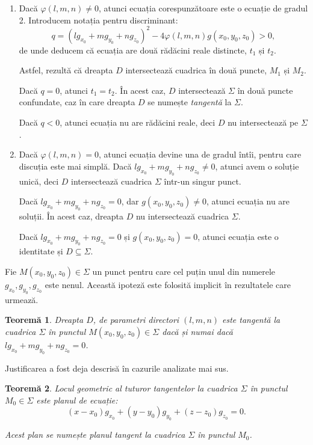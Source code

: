\documentclass[11pt,a4paper]{article}
\newcommand\seq{\subseteq}
\theoremstyle{dotless}
\newtheorem{theorem}{Teorem\u{a}}[section]
\theoremstyle{dotlessdr}
\begin{document}
\begin{enumerate}[(1)]
	\item Dacă $\varphi(l, m, n) \neq 0$, atunci ecuația corespunzătoare
este o ecuație de gradul 2. Introducem notația pentru discriminant: 
 \[
	q = (lg_{x_0} + mg_{y_0} + ng_{z_0})^2 - 
	    4\varphi(l, m, n)g(x_0, y_0, z_0) > 0,
\]
de unde deducem că ecuația are două rădăcini reale distincte, $t_1$ și $t_2$.

Astfel, rezultă că dreapta $D$ intersectează cuadrica în două puncte, $M_1$ și
$M_2$. 

Dacă $q = 0$, atunci $t_1 = t_2$. În acest caz, $D$ intersectează $\Sigma$ în
două puncte confundate, caz în care dreapta $D$ se numește \emph{tangentă} la
$\Sigma$.

Dacă $q < 0$, atunci ecuația nu are rădăcini reale, deci $D$ nu intersectează
pe $\Sigma$.

    \item Dacă $\varphi(l, m, n) = 0$, atunci ecuația devine una de gradul
    întîi, pentru care discuția este mai simplă. Dacă $lg_{x_0} + mg_{y_0} +
ng_{z_0} \neq 0$, atunci avem o soluție unică, deci $D$ intersectează
cuadrica $\Sigma$ într-un singur punct.

Dacă $lg_{x_0} + mg_{y_0} + ng_{z_0} = 0$, dar $g(x_0, y_0, z_0) \neq 0$, atunci
ecuația nu are soluții. În acest caz, dreapta $D$ nu intersectează cuadrica
$\Sigma$.

Dacă $lg_{x_0} + mg_{y_0} + ng_{z_0} = 0$ și $g(x_0, y_0, z_0) = 0$, atunci
ecuația este o identitate și $D \seq \Sigma$.

\end{enumerate}

Fie $M(x_0, y_0, z_0) \in \Sigma$ un punct pentru care cel puțin unul din
numerele $g_{x_0}, g_{y_0}, g_{z_0}$ este nenul. Această ipoteză este folosită
implicit în rezultatele care urmează.

\begin{theorem}
	Dreapta $D$, de parametri directori $(l, m, n)$ este tangentă la cuadrica
$\Sigma$ în punctul $M(x_0, y_0, z_0) \in \Sigma$ dacă și numai dacă
$lg_{x_0} + mg_{y_0} + ng_{z_0} = 0$.
\end{theorem}

Justificarea a fost deja descrisă în cazurile analizate mai sus.

\begin{theorem}
	Locul geometric al tuturor tangentelor la cuadrica $\Sigma$ în punctul
$M_0 \in \Sigma$ este planul de ecuație: 
 \[
	(x - x_0)g_{x_0} + (y - y_0)g_{y_0} + (z - z_0) g_{z_0} = 0.
\]

Acest plan se numește \emph{planul tangent} la cuadrica $\Sigma$ în punctul
$M_0$.
\end{theorem}
\end{document}
